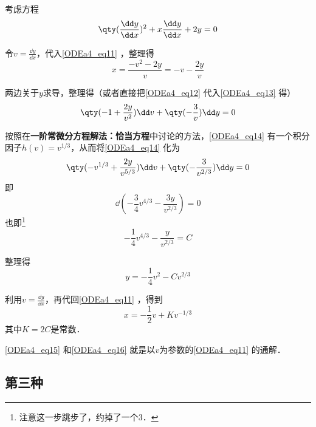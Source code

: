 \begin{example}{}
考虑方程
\begin{equation}\label{ODEa4_eq11}
\qty(\frac{\dd y}{\dd x})^2+x\frac{\dd y}{\dd x}+2y=0
\end{equation}

令$v=\frac{\dd y}{\dd x}$，代入\autoref{ODEa4_eq11} ，整理得
\begin{equation}\label{ODEa4_eq12}
x=\frac{-v^2-2y}{v}=-v-\frac{2y}{v}
\end{equation}



两边关于$y$求导，整理得（或者直接把\autoref{ODEa4_eq12} 代入\autoref{ODEa4_eq13} 得）
\begin{equation}\label{ODEa4_eq14}
\qty(-1+\frac{2y}{v^2})\dd v+\qty(-\frac{3}{v})\dd y=0
\end{equation}

按照在\textbf{一阶常微分方程解法：恰当方程}中讨论的方法，\autoref{ODEa4_eq14} 有一个积分因子$h(v)=v^{1/3}$，从而将\autoref{ODEa4_eq14} 化为
\begin{equation}
\qty(-v^{1/3}+\frac{2y}{v^{5/3}})\dd v+\qty(-\frac{3}{v^{2/3}})\dd y=0
\end{equation}
即
\begin{equation}
\dd (-\frac{3}{4}v^{4/3}-\frac{3y}{v^{2/3}})=0
\end{equation}
也即\footnote{注意这一步跳步了，约掉了一个$3$．}
\begin{equation}
-\frac{1}{4}v^{4/3}-\frac{y}{v^{2/3}}=C
\end{equation}

整理得
\begin{equation}\label{ODEa4_eq15}
y=-\frac{1}{4}v^2-Cv^{2/3}
\end{equation}

利用$v=\frac{\dd y}{\dd x}$，再代回\autoref{ODEa4_eq11} ，得到
\begin{equation}\label{ODEa4_eq16}
x=-\frac{1}{2}v+Kv^{-1/3}
\end{equation}
其中$K=2C$是常数．

\autoref{ODEa4_eq15} 和\autoref{ODEa4_eq16} 就是以$v$为参数的\autoref{ODEa4_eq11} 的通解．



\end{example}



\subsection{第三种}

